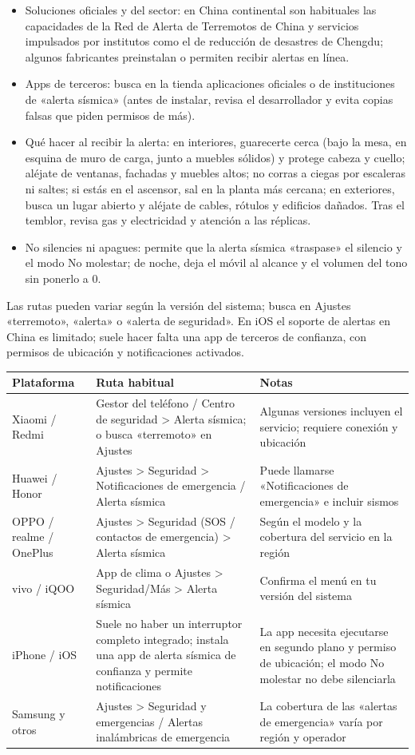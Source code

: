 \begin{itemize}
  \item Soluciones oficiales y del sector: en China continental son habituales las capacidades de la Red de Alerta de Terremotos de China y servicios impulsados por institutos como el de reducción de desastres de Chengdu; algunos fabricantes preinstalan o permiten recibir alertas en línea.
  \item Apps de terceros: busca en la tienda aplicaciones oficiales o de instituciones de «alerta sísmica» (antes de instalar, revisa el desarrollador y evita copias falsas que piden permisos de más).
  \item Qué hacer al recibir la alerta: en interiores, guarecerte cerca (bajo la mesa, en esquina de muro de carga, junto a muebles sólidos) y protege cabeza y cuello; aléjate de ventanas, fachadas y muebles altos; no corras a ciegas por escaleras ni saltes; si estás en el ascensor, sal en la planta más cercana; en exteriores, busca un lugar abierto y aléjate de cables, rótulos y edificios dañados. Tras el temblor, revisa gas y electricidad y atención a las réplicas.
  \item No silencies ni apagues: permite que la alerta sísmica «traspase» el silencio y el modo No molestar; de noche, deja el móvil al alcance y el volumen del tono sin ponerlo a 0.
\end{itemize}


Las rutas pueden variar según la versión del sistema; busca en Ajustes «terremoto», «alerta» o «alerta de seguridad». En iOS el soporte de alertas en China es limitado; suele hacer falta una app de terceros de confianza, con permisos de ubicación y notificaciones activados.

\begin{center}
\begin{tabularx}{\linewidth}{|X|X|X|}
\hline
\textbf{Plataforma} & \textbf{Ruta habitual} & \textbf{Notas} \tabularnewline
\hline
Xiaomi / Redmi & Gestor del teléfono / Centro de seguridad > Alerta sísmica; o busca «terremoto» en Ajustes & Algunas versiones incluyen el servicio; requiere conexión y ubicación \tabularnewline
Huawei / Honor & Ajustes > Seguridad > Notificaciones de emergencia / Alerta sísmica & Puede llamarse «Notificaciones de emergencia» e incluir sismos \tabularnewline
OPPO / realme / OnePlus & Ajustes > Seguridad (SOS / contactos de emergencia) > Alerta sísmica & Según el modelo y la cobertura del servicio en la región \tabularnewline
vivo / iQOO & App de clima o Ajustes > Seguridad/Más > Alerta sísmica & Confirma el menú en tu versión del sistema \tabularnewline
iPhone / iOS & Suele no haber un interruptor completo integrado; instala una app de alerta sísmica de confianza y permite notificaciones & La app necesita ejecutarse en segundo plano y permiso de ubicación; el modo No molestar no debe silenciarla \tabularnewline
Samsung y otros & Ajustes > Seguridad y emergencias / Alertas inalámbricas de emergencia & La cobertura de las «alertas de emergencia» varía por región y operador \tabularnewline
\hline
\end{tabularx}
\end{center}

